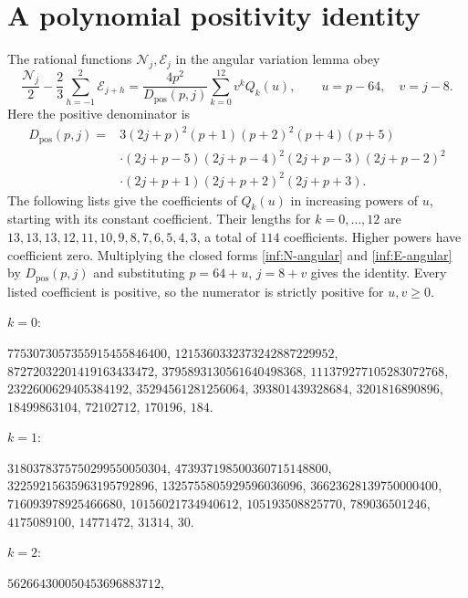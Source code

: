 \section{A polynomial positivity identity}\label{inf:sec-positivity}
The rational functions $\mathcal N_j,\mathcal E_j$ in the angular variation lemma obey
\[\frac{\mathcal N_j}{2}-\frac23\sum_{h=-1}^{2}\mathcal E_{j+h}
=\frac{4p^2}{D_{\mathrm{pos}}(p,j)}\sum_{k=0}^{12}v^k Q_k(u),
\qquad u=p-64,\quad v=j-8.\]
Here the positive denominator is
\begin{align*}D_{\mathrm{pos}}(p,j)={}&3(2j+p)^2(p+1)(p+2)^2(p+4)(p+5)\\
&\cdot(2j+p-5)(2j+p-4)^2(2j+p-3)(2j+p-2)^2\\
&\cdot(2j+p+1)(2j+p+2)^2(2j+p+3).\end{align*}
The following lists give the coefficients of $Q_k(u)$ in increasing
powers of $u$, starting with its constant coefficient. Their lengths
for $k=0,\ldots,12$ are $13,13,13,12,11,10,9,8,7,6,5,4,3$, a
total of $114$ coefficients. Higher powers have coefficient zero.
Multiplying the closed forms \eqref{inf:N-angular} and
\eqref{inf:E-angular} by $D_{\mathrm{pos}}(p,j)$ and substituting
$p=64+u$, $j=8+v$ gives the identity. Every listed coefficient is
positive, so the numerator is strictly positive for $u,v\ge0$.
\par\smallskip\noindent$k=0$: \begingroup\small\raggedright
$7753073057355915455846400$,\allowbreak{} 
$1215360332373242887229952$,\allowbreak{} 
$87272032201419163433472$,\allowbreak{} 
$3795893130561640498368$,\allowbreak{} 
$111379277105283072768$,\allowbreak{} 
$2322600629405384192$,\allowbreak{} 
$35294561281256064$,\allowbreak{} 
$393801439328684$,\allowbreak{} 
$3201816890896$,\allowbreak{} 
$18499863104$,\allowbreak{} 
$72102712$,\allowbreak{} 
$170196$,\allowbreak{} 
$184$.\par\endgroup
\par\smallskip\noindent$k=1$: \begingroup\small\raggedright
$3180378375750299550050304$,\allowbreak{} 
$473937198500360715148800$,\allowbreak{} 
$32259215635963195792896$,\allowbreak{} 
$1325755805929596036096$,\allowbreak{} 
$36623628139750000400$,\allowbreak{} 
$716093978925466680$,\allowbreak{} 
$10156021734940612$,\allowbreak{} 
$105193508825770$,\allowbreak{} 
$789036501246$,\allowbreak{} 
$4175089100$,\allowbreak{} 
$14771472$,\allowbreak{} 
$31314$,\allowbreak{} 
$30$.\par\endgroup
\par\smallskip\noindent$k=2$: \begingroup\small\raggedright
$562664300050453696883712$,\allowbreak{} 
